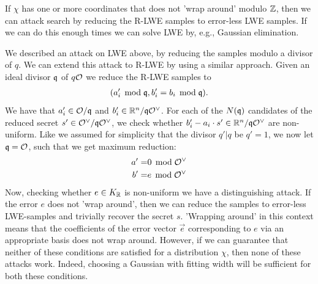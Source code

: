     If \(\chi\) has one or more coordinates that does not 'wrap around' modulo \(\mathbb{Z}\), then we can attack search by reducing the R-LWE samples to error-less LWE samples. If we can do this enough times we can solve LWE by, e.g., Gaussian elimination. \par
    
    We described an attack on LWE above, by reducing the samples modulo a divisor of \(q\). We can extend this attack to R-LWE by using a similar approach. Given an ideal divisor \(\mathfrak{q}\) of \(q\mathcal{O}\) we reduce the R-LWE samples to
    \begin{align*}
        (a_i'\mathop{}\!\mathrm{\; mod \;} \mathfrak{q} , b_i' = b_i\mathop{}\!\mathrm{\; mod \;} \mathfrak{q}).
    \end{align*}
    We have that \(a_i'\in\mathcal{O}/\mathfrak{q}\) and \(b_i' \in \mathbb{R}^n/\mathfrak{q}\mathcal{O} ^\vee\). For each of the \(N(\mathfrak{q})\) candidates of the reduced secret \(s'\in\mathcal{O}^\vee/\mathfrak{q}\mathcal{O}^\vee\), we check whether \(b_i' - a_i\cdot s'\in\mathbb{R}^n/\mathfrak{q}\mathcal{O}^\vee\) are non-uniform. Like we assumed for simplicity that the divisor \(q'|q\) be \( q' = 1\), we now let \(\mathfrak{q} = \mathcal{O}\), such that we get maximum reduction:
    \begin{equation*}
        \begin{split}
            a' = & 0\mathop{}\!\mathrm{\; mod \;}\mathcal{O}^\vee\\
            b' = & e\mathop{}\!\mathrm{\; mod \;}\mathcal{O}^\vee
        \end{split}
    \end{equation*}
    Now, checking whether \(e\in K_{\mathbb{R}}\) is non-uniform we have a distinguishing attack. If the error \(e\) does not 'wrap around', then we can reduce the samples to error-less LWE-samples and trivially recover the secret \(s\). 'Wrapping around' in this context means that the coefficients of the error vector \(\vec{e}\) corresponding to \(e\) via an appropriate basis does not wrap around. However, if we can guarantee that neither of these conditions are satisfied for a distribution \(\chi\), then none of these attacks work. Indeed, choosing a Gaussian with fitting width will be sufficient for both these conditions.\par
    
